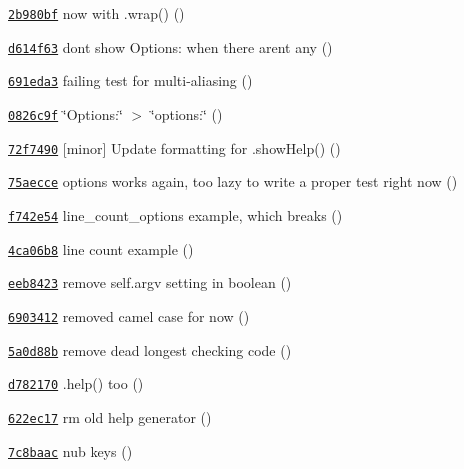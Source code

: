\begin{DoxyItemize}
\item \href{https://github.com/bcoe/yargs/commit/2b980bf2656b4ee8fc5134dc5f56a48855c35198}{\tt 2b980bf} now with .wrap() ()
\item \href{https://github.com/bcoe/yargs/commit/d614f639654057d1b7e35e3f5a306e88ec2ad1e4}{\tt d614f63} don\textquotesingle{}t show \textquotesingle{}Options\+:\textquotesingle{} when there aren\textquotesingle{}t any ()
\item \href{https://github.com/bcoe/yargs/commit/691eda354df97b5a86168317abcbcaabdc08a0fb}{\tt 691eda3} failing test for multi-\/aliasing ()
\item \href{https://github.com/bcoe/yargs/commit/0826c9f462109feab2bc7a99346d22e72bf774b7}{\tt 0826c9f} \char`\"{}\+Options\+:\char`\"{} $>$ \char`\"{}options\+:\char`\"{} ()
\item \href{https://github.com/bcoe/yargs/commit/72f749025d01b7f295738ed370a669d885fbada0}{\tt 72f7490} \mbox{[}minor\mbox{]} Update formatting for {\ttfamily .show\+Help()} ()
\item \href{https://github.com/bcoe/yargs/commit/75aeccea74329094072f95800e02c275e7d999aa}{\tt 75aecce} options works again, too lazy to write a proper test right now ()
\item \href{https://github.com/bcoe/yargs/commit/f742e5439817c662dc3bd8734ddd6467e6018cfd}{\tt f742e54} line\+\_\+count\+\_\+options example, which breaks ()
\item \href{https://github.com/bcoe/yargs/commit/4ca06b8b4ea99b5d5714b315a2a8576bee6e5537}{\tt 4ca06b8} line count example ()
\item \href{https://github.com/bcoe/yargs/commit/eeb8423e0a5ecc9dc3eb1e6df9f3f8c1c88f920b}{\tt eeb8423} remove self.\+argv setting in boolean ()
\item \href{https://github.com/bcoe/yargs/commit/69034126804660af9cc20ea7f4457b50338ee3d7}{\tt 6903412} removed camel case for now ()
\item \href{https://github.com/bcoe/yargs/commit/5a0d88bf23e9fa79635dd034e2a1aa992acc83cd}{\tt 5a0d88b} remove dead longest checking code ()
\item \href{https://github.com/bcoe/yargs/commit/d782170babf7284b1aa34f5350df0dd49c373fa8}{\tt d782170} .help() too ()
\item \href{https://github.com/bcoe/yargs/commit/622ec17379bb5374fdbb190404c82bc600975791}{\tt 622ec17} rm old help generator ()
\item \href{https://github.com/bcoe/yargs/commit/7c8baac4d66195e9f5158503ea9ebfb61153dab7}{\tt 7c8baac} nub keys ()

\end{DoxyItemize}
